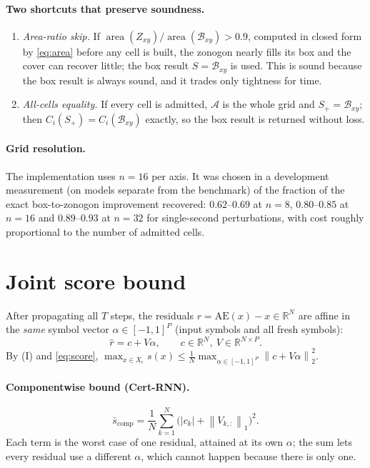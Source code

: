 \documentclass[11pt]{article}
\theoremstyle{definition}
\theoremstyle{remark}
\newcommand{\R}{\mathbb{R}}
\newcommand{\Bx}{\mathcal{B}}
\newcommand{\abs}[1]{\left\lvert #1 \right\rvert}
\newcommand{\norm}[1]{\left\lVert #1 \right\rVert}
\begin{document}
\paragraph{Two shortcuts that preserve soundness.}
\begin{enumerate}
\item \emph{Area-ratio skip.} If $\operatorname{area}(Z_{xy})/\operatorname{area}(\Bx_{xy}) > 0.9$, computed in closed form by \eqref{eq:area} before any cell is built, the zonogon nearly fills its box and the cover can recover little; the box result $S = \Bx_{xy}$ is used. This is sound because the box result is always sound, and it trades only tightness for time.
\item \emph{All-cells equality.} If every cell is admitted, $\mathcal{A}$ is the whole grid and $S_+ = \Bx_{xy}$; then $C_i(S_+) = C_i(\Bx_{xy})$ exactly, so the box result is returned without loss.
\end{enumerate}

\paragraph{Grid resolution.} The implementation uses $n = 16$ per axis. It was chosen in a development measurement (on models separate from the benchmark) of the fraction of the exact box-to-zonogon improvement recovered: $0.62$--$0.69$ at $n=8$, $0.80$--$0.85$ at $n=16$ and $0.89$--$0.93$ at $n=32$ for single-second perturbations, with cost roughly proportional to the number of admitted cells.

\section{Joint score bound}

After propagating all $T$ steps, the residuals $r = \mathrm{AE}(x) - x \in \R^N$ are affine in the \emph{same} symbol vector $\alpha\in[-1,1]^P$ (input symbols and all fresh symbols):
\begin{equation}
\hat r = c + V\alpha,\qquad c\in\R^N,\ V\in\R^{N\times P}.
\end{equation}
By (I) and \eqref{eq:score}, $\max_{x\in X_\epsilon} s(x) \le \frac1N\max_{\alpha\in[-1,1]^P}\norm{c+V\alpha}_2^2$.

\paragraph{Componentwise bound (Cert-RNN).}
\begin{equation}
\bar s_{\mathrm{comp}} = \frac1N\sum_{k=1}^{N}\bigl(\abs{c_k} + \norm{V_{k,:}}_1\bigr)^2 .
\label{eq:comp}
\end{equation}
Each term is the worst case of one residual, attained at its own $\alpha$; the sum lets every residual use a different $\alpha$, which cannot happen because there is only one.
\end{document}
